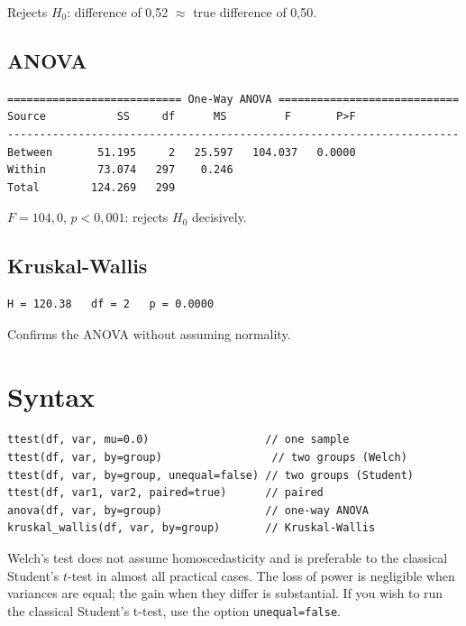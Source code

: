 Rejects $H_0$: difference of 0{,}52 $\approx$ true difference of 0{,}50.

\subsection*{ANOVA}

\begin{lstlisting}[language={}, basicstyle=\ttfamily\small, frame=none,
  numbers=none, backgroundcolor=\color{codbg}]
=========================== One-Way ANOVA ============================
Source           SS     df      MS         F       P>F
----------------------------------------------------------------------
Between       51.195     2   25.597   104.037   0.0000
Within        73.074   297    0.246
Total        124.269   299
\end{lstlisting}

$F = 104{,}0$, $p < 0{,}001$: rejects $H_0$ decisively.

\subsection*{Kruskal-Wallis}

\begin{lstlisting}[language={}, basicstyle=\ttfamily\small, frame=none,
  numbers=none, backgroundcolor=\color{codbg}]
H = 120.38   df = 2   p = 0.0000
\end{lstlisting}

Confirms the ANOVA without assuming normality.

\section{Syntax}

\begin{lstlisting}
ttest(df, var, mu=0.0)                  // one sample
ttest(df, var, by=group)                 // two groups (Welch)
ttest(df, var, by=group, unequal=false) // two groups (Student)
ttest(df, var1, var2, paired=true)      // paired
anova(df, var, by=group)                // one-way ANOVA
kruskal_wallis(df, var, by=group)       // Kruskal-Wallis
\end{lstlisting}

\begin{nota}
  Welch's test does not assume homoscedasticity and is preferable to the
  classical Student's $t$-test in almost all practical cases. The loss of power
  is negligible when variances are equal; the gain when they differ
  is substantial. If you wish to run the classical Student's t-test, use the
  option \texttt{unequal=false}.
\end{nota}
